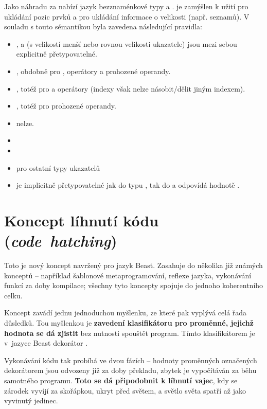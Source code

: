 Jako náhradu za  nabízí jazyk bezznaménkové typy  a .  je zamýšlen k užití pro ukládání pozic prvků a  pro ukládání informace o velikosti (např. seznamů). V souladu s touto sémantikou byla zavedena následující pravidla:
\begin{itemize}
	\item {},  a  (s velikostí menší nebo rovnou velikosti ukazatele) jsou mezi sebou explicitně přetypovatelné.
	\item {}, obdobně pro , operátory \inlineCode{\- * /} a prohozené operandy.
	\item {}, totéž pro  a operátory \inlineCode{\- * /} (indexy však nelze násobit/dělit jiným indexem).
	\item {}, totéž pro prohozené operandy.
	\item {} nelze.
	\item {}
	\item {}
	\item {} pro ostatní typy ukazatelů
	\item {} je implicitně přetypovatelné jak do typu , tak do  a odpovídá hodnotě .
\end{itemize}

\chapter{Koncept líhnutí kódu (\textit{code~hatching})} \label{ctime}
Toto je nový koncept navržený pro jazyk Beast. Zasahuje do několika již známých konceptů -- například šablonové metaprogramování, reflexe jazyka, vykonávání funkcí za doby kompilace; všechny tyto koncepty spojuje do jednoho koherentního celku.

Koncept zavádí jednu jednoduchou myšlenku, ze které pak vyplývá celá řada důsledků. Tou myšlenkou je \textbf{zavedení klasifikátoru pro proměnné, jejichž hodnota se dá zjistit} bez nutnosti spouštět program. Tímto klasifikátorem je v~jazyce Beast dekorátor \ctime.

Vykonávání kódu tak probíhá ve dvou fázích -- hodnoty proměnných označených dekorátorem \ctime jsou odvozeny již za doby překladu, zbytek je vypočítáván za běhu samotného programu. \textbf{Toto se dá připodobnit k líhnutí vajec}, kdy se zárodek vyvíjí za skořápkou, ukryt před světem, a světlo světa spatří až jako vyvinutý jedinec.

